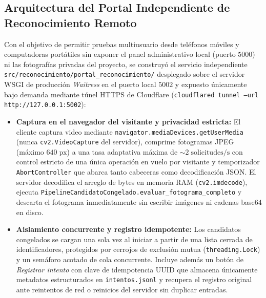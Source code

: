 \documentclass{article}
\begin{document}
\subsection{Arquitectura del Portal Independiente de Reconocimiento Remoto}
Con el objetivo de permitir pruebas multiusuario desde teléfonos móviles y computadoras portátiles sin exponer el panel administrativo local (puerto $5000$) ni las fotografías privadas del proyecto, se construyó el servicio independiente \texttt{src/reconocimiento/portal\_reconocimiento/} desplegado sobre el servidor WSGI de producción \textit{Waitress} en el puerto local $5002$ y expuesto únicamente bajo demanda mediante túnel HTTPS de Cloudflare (\texttt{cloudflared tunnel --url http://127.0.0.1:5002}):
\begin{itemize}
    \item \textbf{Captura en el navegador del visitante y privacidad estricta:} El cliente captura video mediante \texttt{navigator.mediaDevices.getUserMedia} (nunca \texttt{cv2.VideoCapture} del servidor), comprime fotogramas JPEG (máximo $640\;\text{px}$) a una tasa adaptativa máxima de $\sim 2\;\text{solicitudes/s}$ con control estricto de una única operación en vuelo por visitante y temporizador \texttt{AbortController} que abarca tanto cabeceras como decodificación JSON. El servidor decodifica el arreglo de bytes en memoria RAM (\texttt{cv2.imdecode}), ejecuta \texttt{PipelineCandidatoCongelado.evaluar\_fotograma\_completo} y descarta el fotograma inmediatamente sin escribir imágenes ni cadenas base64 en disco.
    \item \textbf{Aislamiento concurrente y registro idempotente:} Los candidatos congelados se cargan una sola vez al iniciar a partir de una lista cerrada de identificadores, protegidos por cerrojos de exclusión mutua (\texttt{threading.Lock}) y un semáforo acotado de cola concurrente. Incluye además un botón de \textit{Registrar intento} con clave de idempotencia UUID que almacena únicamente metadatos estructurados en \texttt{intentos.jsonl} y recupera el registro original ante reintentos de red o reinicios del servidor sin duplicar entradas.
\end{itemize}
\end{document}
